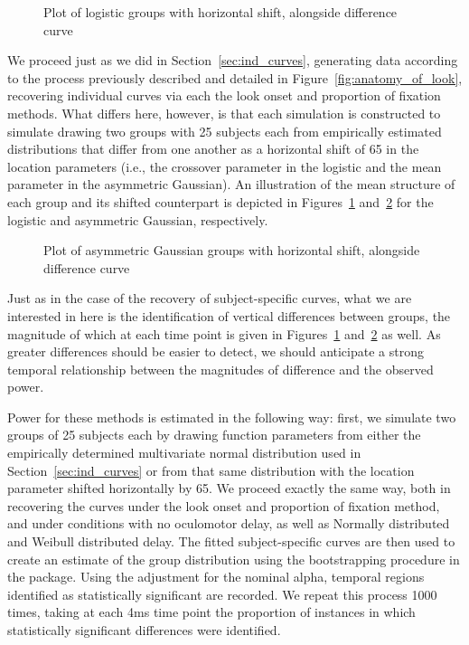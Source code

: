 \begin{figure}[H]
    \centering
    \caption{Plot of logistic groups with horizontal shift, alongside difference curve}
\label{fig:logistic_shift}
\end{figure}



We proceed just as we did in Section~\ref{sec:ind_curves}, generating data according to the process previously described and detailed in Figure~\ref{fig:anatomy_of_look}, recovering individual curves via each the look onset and proportion of fixation methods. What differs here, however, is that each simulation is constructed to simulate drawing two groups with 25 subjects each from empirically estimated distributions that differ from one another as a horizontal shift of 65 in the location parameters (i.e., the crossover parameter in the logistic and the mean parameter in the asymmetric Gaussian). An illustration of the mean structure of each group and its shifted counterpart is depicted in Figures~\ref{fig:logistic_shift} and~\ref{fig:dg_shift} for the logistic and asymmetric Gaussian, respectively.

\begin{figure}[H]
    \centering
    \caption{Plot of asymmetric Gaussian groups with horizontal shift, alongside difference curve}
\label{fig:dg_shift}
\end{figure}

Just as in the case of the recovery of subject-specific curves, what we are interested in here is the identification of vertical differences between groups, the magnitude of which at each time point is given in Figures~\ref{fig:logistic_shift} and~\ref{fig:dg_shift} as well. As greater differences should be easier to detect, we should anticipate a strong temporal relationship between the magnitudes of difference  and the observed power.

Power for these methods is estimated in the following way: first, we simulate two groups of 25 subjects each by drawing function parameters from either the empirically determined multivariate normal distribution used in Section~\ref{sec:ind_curves} or from that same distribution with the location parameter shifted horizontally by 65. We proceed exactly the same way, both in recovering the curves under the look onset and proportion of fixation method, and under conditions with no oculomotor delay, as well as Normally distributed and Weibull distributed delay. The fitted subject-specific curves are then used to create an estimate of the group distribution using the bootstrapping procedure in the  package. Using the  adjustment for the nominal alpha, temporal regions identified as statistically significant are recorded. We repeat this process 1000 times, taking at each 4ms time point the proportion of instances in which statistically significant differences were identified.




